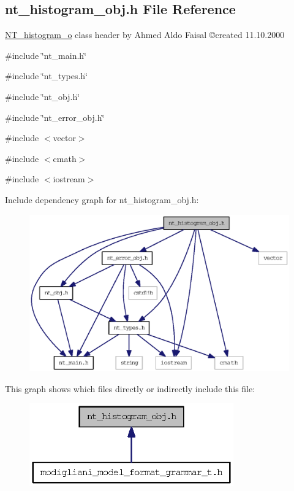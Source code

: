 \subsection{nt\_\-histogram\_\-obj.h File Reference}
\label{nt__histogram__obj_8h}



\begin{DoxyItemize}
\item \hyperlink{class_n_t__histogram__o}{NT\_\-histogram\_\-o} class header by Ahmed Aldo Faisal \copyright created 11.10.2000 
\end{DoxyItemize} 


{\ttfamily \#include \char`\"{}nt\_\-main.h\char`\"{}}\par
{\ttfamily \#include \char`\"{}nt\_\-types.h\char`\"{}}\par
{\ttfamily \#include \char`\"{}nt\_\-obj.h\char`\"{}}\par
{\ttfamily \#include \char`\"{}nt\_\-error\_\-obj.h\char`\"{}}\par
{\ttfamily \#include $<$vector$>$}\par
{\ttfamily \#include $<$cmath$>$}\par
{\ttfamily \#include $<$iostream$>$}\par
Include dependency graph for nt\_\-histogram\_\-obj.h:
\nopagebreak
\begin{figure}[H]
\begin{center}
\leavevmode
\includegraphics[width=400pt]{nt__histogram__obj_8h__incl}
\end{center}
\end{figure}
This graph shows which files directly or indirectly include this file:
\nopagebreak
\begin{figure}[H]
\begin{center}
\leavevmode
\includegraphics[width=250pt]{nt__histogram__obj_8h__dep__incl}
\end{center}
\end{figure}
